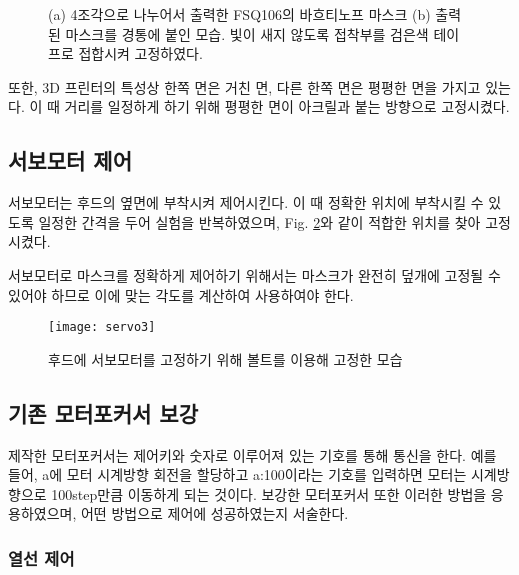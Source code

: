  
	\begin{figure}[ht]
	\begin{center}
	\end{center}
	\caption{(a) 4조각으로 나누어서 출력한 FSQ106의 바흐티노프 마스크 (b) 출력된 마스크를 경통에 붙인 모습. 빛이 새지 않도록 접착부를 검은색 테이프로 접합시켜 고정하였다.}
	\label{mask}
	\end{figure}


또한, 3D 프린터의 특성상 한쪽 면은 거친 면, 다른 한쪽 면은 평평한 면을 가지고 있는다. 이 때 거리를 일정하게 하기 위해 평평한 면이 아크릴과 붙는 방향으로 고정시켰다.




\subsection{서보모터 제어}

 서보모터는 후드의 옆면에 부착시켜 제어시킨다. 이 때 정확한 위치에 부착시킬 수 있도록 일정한 간격을 두어 실험을 반복하였으며, Fig. \ref{servo}와 같이 적합한 위치를 찾아 고정시켰다. 

서보모터로 마스크를 정확하게 제어하기 위해서는 마스크가 완전히 덮개에 고정될 수 있어야 하므로 이에 맞는 각도를 계산하여 사용하여야 한다.

\begin{figure}[ht]
	\begin{center}
		\texttt{[image: servo3]}
	\end{center}
	\caption{후드에 서보모터를 고정하기 위해 볼트를 이용해 고정한 모습}
	\label{servo}
\end{figure}

\subsection{기존 모터포커서 보강}
 제작한 모터포커서는 제어키와 숫자로 이루어져 있는 기호를 통해 통신을 한다. 예를 들어, a에 모터 시계방향 회전을 할당하고 a:100이라는 기호를 입력하면 모터는 시계방향으로 100step만큼 이동하게 되는 것이다. 보강한 모터포커서 또한 이러한 방법을 응용하였으며, 어떤 방법으로 제어에 성공하였는지 서술한다.
 
\subsubsection{열선 제어}

